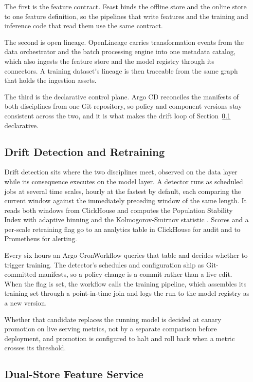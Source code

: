 The first is the feature contract. Feast binds the offline store and the online store to one feature definition, so the pipelines that write features and the training and inference code that read them use the same contract.

The second is open lineage. OpenLineage carries transformation events from the data orchestrator and the batch processing engine into one metadata catalog, which also ingests the feature store and the model registry through its connectors. A training dataset's lineage is then traceable from the same graph that holds the ingestion assets.

The third is the declarative control plane. Argo CD reconciles the manifests of both disciplines from one Git repository, so policy and component versions stay consistent across the two, and it is what makes the drift loop of Section~\ref{subsec:drift} declarative.

\subsection{Drift Detection and Retraining}
\label{subsec:drift}

Drift detection sits where the two disciplines meet, observed on the data layer while its consequence executes on the model layer. A detector runs as scheduled jobs at several time scales, hourly at the fastest by default, each comparing the current window against the immediately preceding window of the same length. It reads both windows from ClickHouse and computes the Population Stability Index with adaptive binning and the Kolmogorov-Smirnov statistic \cite{reis2016kdd}. Scores and a per-scale retraining flag go to an analytics table in ClickHouse for audit and to Prometheus for alerting.

Every six hours an Argo CronWorkflow queries that table and decides whether to trigger training. The detector's schedules and configuration ship as Git-committed manifests, so a policy change is a commit rather than a live edit. When the flag is set, the workflow calls the training pipeline, which assembles its training set through a point-in-time join and logs the run to the model registry as a new version.

Whether that candidate replaces the running model is decided at canary promotion on live serving metrics, not by a separate comparison before deployment, and promotion is configured to halt and roll back when a metric crosses its threshold.

\subsection{Dual-Store Feature Service}
\label{subsec:feature}

